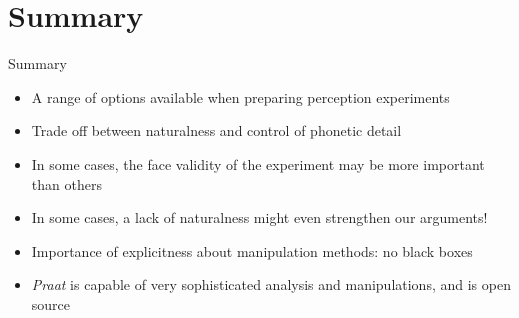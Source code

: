 \documentclass{beamer}
\begin{document}
\section{Summary}
\begin{frame}{Summary}
\begin{itemize}
\item{A range of options available when preparing perception experiments}
\item{Trade off between naturalness and control of phonetic detail}
\item{In some cases, the face validity of the experiment may be more important than others}
\item{In some cases, a lack of naturalness might even strengthen our arguments!}
\item{Importance of explicitness about manipulation methods: no black boxes}
\item{\textit{Praat} is capable of very sophisticated analysis and manipulations, and is open source}
\end{itemize}

\end{frame}
\end{document}
